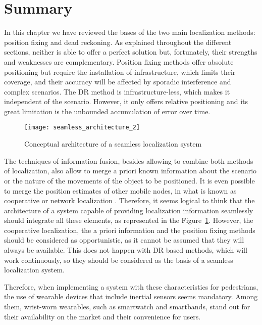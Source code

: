 \section{Summary}
\label{sec:2_6_summary}
In this chapter we have reviewed the bases of the two main localization methods: position fixing and dead reckoning.
As explained throughout the different sections, neither is able to offer a perfect solution but, fortunately, their strengths and weaknesses are complementary.
Position fixing methods offer absolute positioning but require the installation of infrastructure, which limits their coverage, and their accuracy will be affected by sporadic interference and complex scenarios.
The DR method is infrastructure-less, which makes it independent of the scenario. However, it only offers relative positioning and its great limitation is the unbounded accumulation of error over time.

\begin{figure}[!t]
	\centering
	\texttt{[image: seamless\_architecture\_2]}	
	\caption{Conceptual architecture of a seamless localization system}
	\label{fig:architecture}
\end{figure}
The techniques of information fusion, besides allowing to combine both methods of localization, also allow to merge a priori known information about the scenario or the nature of the movements of the object to be positioned.
It is even possible to merge the position estimates of other mobile nodes, in what is known as cooperative or network localization \cite{wymeersch_cooperative_2009}.
Therefore, it seems logical to think that the architecture of a system capable of providing localization information seamlessly should integrate all these elements, as represented in the Figure~\ref{fig:architecture}.
However, the cooperative localization, the a priori information and the position fixing methods should be considered as opportunistic, as it cannot be assumed that they will always be available.
This does not happen with DR based methods, which will work continuously, so they should be considered as the basis of a seamless localization system.

Therefore, when implementing a system with these characteristics for pedestrians, the use of wearable devices that include inertial sensors seems mandatory.
Among them, wrist-worn wearables, such as smartwatch and smartbands, stand out for their availability on the market and their convenience for users.
